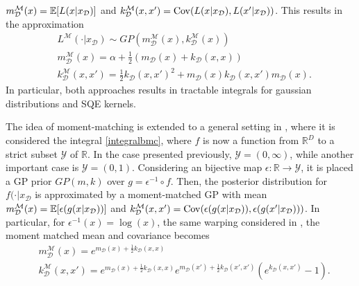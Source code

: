  $m^\mathcal{M}_\mathcal{D}(x) = {\mathbb E}[L(x|x_\mathcal{D})]$ and $k^\mathcal{M}_\mathcal{D}(x,x') = \mathrm{Cov}(L(x|x_\mathcal{D}),L(x'|x_\mathcal{D}))$. This results in the approximation
 \begin{equation}\label{sqmomentmatched}
  \begin{split}
  & L^{\mathcal{M}}(\cdot|x_\mathcal{D}) \sim GP(m_\mathcal{D}^\mathcal{M}(x),k_\mathcal{D}^\mathcal{M}(x)) \\
  & m_\mathcal{D}^\mathcal{M}(x) = \alpha + \frac{1}{2} (m_\mathcal{D}(x) + k_\mathcal{D}(x,x)) \\
  & k_\mathcal{D}^\mathcal{M}(x,x') = \frac{1}{2} k_\mathcal{D}(x,x')^2 + m_\mathcal{D}(x) k_\mathcal{D}(x,x') m_\mathcal{D}(x).
  \end{split}
 \end{equation}
In particular, both approaches results in tractable integrals for gaussian distributions and SQE kernels.

The idea of moment-matching is extended to a general setting in \cite{Chai_2019}, where it is considered the integral \eqref{integralbmc}, where $f$ is now a function from $\mathbb{R}^D$ to a strict subset $\mathcal{Y}$ of $\mathbb{R}$. In the case presented previously, $\mathcal{Y} = (0,\infty)$, while another important case is $\mathcal{Y} = (0,1)$. Considering an bijective map $\epsilon : \mathbb{R} \to \mathcal{Y}$, it is placed a GP prior $GP(m,k)$ over $g = \epsilon^{-1} \circ f$. Then, the posterior distribution for $f(\cdot|x_\mathcal{D}$ is approximated by a moment-matched GP with mean
$m^\mathcal{M}_\mathcal{D}(x) = {\mathbb E}[\epsilon(g(x|x_\mathcal{D}))]$ and $k^\mathcal{M}_\mathcal{D}(x,x') = 
\mathrm{Cov}(\epsilon(g(x|x_\mathcal{D})),\epsilon(g(x'|x_\mathcal{D})))$. In particular, for $\epsilon^{-1}(x) = \log(x)$, the same warping considered in \cite{Osborne_2012}, the moment matched mean and covariance becomes 
\begin{equation}\label{logmomentmatched}
\begin{split}
 & m^\mathcal{M}_\mathcal{D}(x) = e^{m_\mathcal{D}(x) + \frac{1}{2}k_\mathcal{D}(x,x)}\\
 & k^\mathcal{M}_\mathcal{D}(x,x') =e^{m_\mathcal{D}(x) + \frac{1}{2}k_\mathcal{D}(x,x)} e^{m_\mathcal{D}(x') + \frac{1}{2}k_\mathcal{D}(x',x')} \left(e^{k_\mathcal{D}(x,x')}-1\right).
\end{split}
\end{equation}

